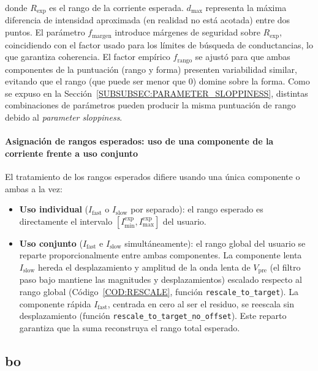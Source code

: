 \noindent donde \(R_{\mathrm{exp}}\) es el rango de la corriente esperada. \(d_{\max}\) representa la máxima diferencia de intensidad aproximada (en realidad no está acotada) entre dos puntos. El parámetro \(f_{\mathrm{margen}}\) introduce márgenes de seguridad sobre \(R_{\mathrm{exp}}\), coincidiendo con el factor usado para los límites de búsqueda de conductancias, lo que garantiza coherencia. El factor empírico \(f_{\mathrm{rango}}\) se ajustó para que ambas componentes de la puntuación (rango y forma) presenten variabilidad similar, evitando que el rango (que puede ser menor que 0) domine sobre la forma. Como se expuso en la Sección~\ref{SUBSUBSEC:PARAMETER_SLOPPINESS}, distintas combinaciones de parámetros pueden producir la misma puntuación de rango debido al \textit{parameter sloppiness}.

\paragraph{Asignación de rangos esperados: uso de una componente de la corriente frente a uso conjunto}

El tratamiento de los rangos esperados difiere usando una única componente o ambas a la vez:

\begin{itemize}
    \item \textbf{Uso individual} (\(I_{\mathrm{fast}}\) o \(I_{\mathrm{slow}}\) por separado): el rango esperado es directamente el intervalo \([I_{\min}^{\mathrm{exp}}, I_{\max}^{\mathrm{exp}}]\) del usuario.
    \item \textbf{Uso conjunto} (\(I_{\mathrm{fast}}\) e \(I_{\mathrm{slow}}\) simultáneamente): el rango global del usuario se reparte proporcionalmente entre ambas componentes. La componente lenta \(I_{\mathrm{slow}}\) hereda el desplazamiento y amplitud de la onda lenta de \(V_{\mathrm{pre}}\) (el filtro paso bajo mantiene las magnitudes y desplazamientos) escalado respecto al rango global (Código~\ref{COD:RESCALE}, función \texttt{rescale\_to\_target}). La componente rápida \(I_{\mathrm{fast}}\), centrada en cero al ser el residuo, se reescala sin desplazamiento (función \texttt{rescale\_to\_target\_no\_offset}). Este reparto garantiza que la suma reconstruya el rango total esperado.
\end{itemize}


\subsection{\acl{bo}\label{SUBSEC:OPTIMIZACION_BAYESIANA}}

